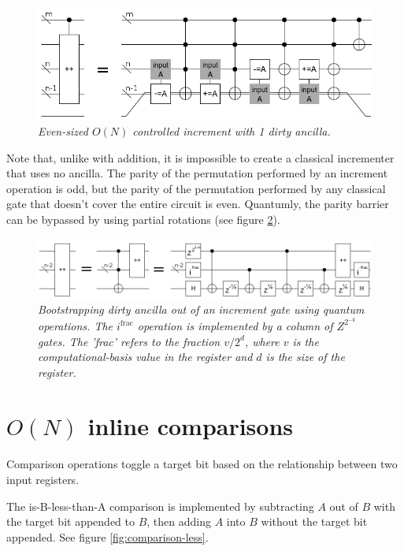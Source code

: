 \documentclass[twocolumn]{article}
\begin{document}
\begin{figure}
  \centering
  \includegraphics[totalheight=2.5cm]{controlled-increment-even.png}
  \caption{\em Even-sized $O(N)$ controlled increment with 1 dirty ancilla.}
  \label{fig:controlled-increment-even}
\end{figure}

Note that, unlike with addition, it is impossible to create a classical incrementer that uses no ancilla.
The parity of the permutation performed by an increment operation is odd, but the parity of the permutation performed by any classical gate that doesn't cover the entire circuit is even.
Quantumly, the parity barrier can be bypassed by using partial rotations (see figure \ref{fig:bootstrap-ancilla}).

\begin{figure}
  \centering
  \includegraphics[totalheight=1.4cm]{ancilla-bootstrap.png}
  \caption{\em Bootstrapping dirty ancilla out of an increment gate using quantum operations.
  The $i^{\text{frac}}$ operation is implemented by a column of $Z^{2^{-k}}$ gates.
  The 'frac' refers to the fraction $v/2^d$, where $v$ is the computational-basis value in the register and $d$ is the size of the register.}
  \label{fig:bootstrap-ancilla}
\end{figure}

\section{$O(N)$ inline comparisons}

Comparison operations toggle a target bit based on the relationship between two input registers.

The is-B-less-than-A comparison is implemented by subtracting $A$ out of $B$ with the target bit appended to $B$, then adding $A$ into $B$ without the target bit appended.
See figure \ref{fig:comparison-less}.
\end{document}

